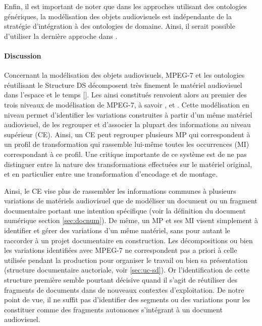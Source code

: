 Enfin, il est important de noter que dans les approches utilisant des ontologies génériques, la modélisation des objets audiovisuels est indépendante de la stratégie d'intégration à des ontologies de domaine.
Ainsi, il serait possible d'utiliser la dernière approche dans .

\paragraph{Discussion}
Concernant la modélisation des objets audiovisuels, MPEG-7 et les ontologies réutilisant le Structure DS décomposent très finement le matériel audiovisuel dans l'espace et le temps [].
Les  ainsi constitués renvoient alors au premier des trois niveaux de modélisation de MPEG-7, à savoir ,  et .
Cette modélisation en niveau permet d'identifier les variations construites à partir d'un même matériel audiovisuel, de les regrouper et d'associer la plupart des informations au niveau supérieur (CE).
Ainsi, un CE peut regrouper plusieurs MP qui correspondent à un profil de transformation qui rassemble lui-même toutes les occurrences (MI) correspondant à ce profil.
Une critique importante de ce système est de ne pas distinguer entre la nature des transformations effectuées sur le matériel original, et en particulier entre une transformation d'encodage et de montage.

Ainsi, le CE vise plus de rassembler les informations communes à plusieurs variations de matériels audiovisuel que de modéliser un document ou un fragment documentaire portant une intention spécifique (voir la définition du document numérique section \ref{sec:docnum}).
De même, un MP et ses MI visent simplement à identifier et gérer des variations d'un même matériel, sans pour autant le raccorder à un projet documentaire en construction.
Les décompositions ou bien les variations identifiées avec MPEG-7 ne correspondent pas a priori à celle utilisée pendant la production pour organiser le travail ou bien sa présentation (structure documentaire auctoriale, voir \ref{sec:uc-sd}).
Or l'identification de cette structure première semble pourtant décisive quand il s'agit de réutiliser des fragments de documents dans de nouveaux contextes d'exploitation. 
De notre point de vue, il ne suffit pas d'identifier des segments ou des variations pour les constituer comme des fragments automones s'intégrant à un document audiovisuel.

